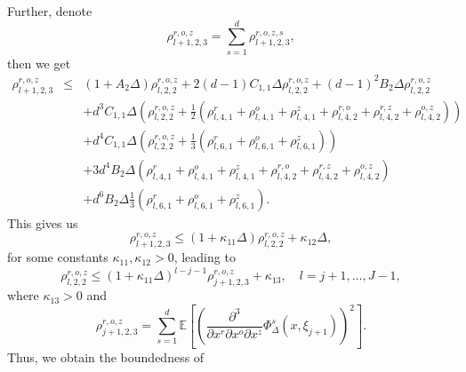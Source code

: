 \documentclass[11pt,a4paper]{amsart}
\theoremstyle{plain}
\theoremstyle{definition}
\theoremstyle{remark}
\numberwithin{equation}{section}
\newcommand*{\EE}{\mathbb E}
\renewcommand*{\doteq}{:=}
\begin{document}
Further, denote 
\[
\rho_{l+1,2,3}^{r,o,z}=\sum_{s=1}^d\rho_{l+1,2,3}^{r,o,z,s},
\]
then we get 
\begin{eqnarray*}
\rho_{l+1,2,3}^{r,o,z} & \leq & (1+A_{2}\Delta)\rho_{l,2,2}^{r,o,z}
+2(d-1)C_{1,1}\Delta\rho_{l,2,2}^{r,o,z}+(d-1)^2B_{2}\Delta\rho_{l,2,2}^{r,o,z}\\
&&+d^3C_{1,1}\Delta\left(\rho_{l,2,2}^{r,o,z}+\frac{1}{2}\left(\rho_{l,4,1}^{r}+\rho_{l,4,1}^{o}+\rho_{l,4,1}^z+\rho_{l,4,2}^{r,o}+\rho_{l,4,2}^{r,z}+\rho_{l,4,2}^{o,z}\right)\right)\\
&&+d^4C_{1,1}\Delta\left(\rho_{l,2,2}^{r,o,z}+\frac{1}{3}\left(\rho_{l,6,1}^{r}+\rho_{l,6,1}^{o}+\rho_{l,6,1}^{z}\right)\right)\\
&&+3d^4B_2\Delta\left(\rho_{l,4,1}^{r}+\rho_{l,4,1}^{o}+\rho_{l,4,1}^z+\rho_{l,4,2}^{r,o}+\rho_{l,4,2}^{r,z}+\rho_{l,4,2}^{o,z}\right)\\
&&+d^6B_2\Delta\frac{1}{3}\left(\rho_{l,6,1}^{r}+\rho_{l,6,1}^{o}+\rho_{l,6,1}^{z}\right).
\end{eqnarray*}
This gives us
\[
\rho_{l+1,2,3}^{r,o,z}\leq (1+\kappa_{11}\Delta)\rho_{l,2,2}^{r,o,z}+\kappa_{12}\Delta,
\]
for some constants $\kappa_{11},\kappa_{12}>0$,
leading to
\[
\rho_{l,2,2}^{r,o,z}\leq(1+\kappa_{11}\Delta)^{l-j-1}\rho_{j+1,2,3}^{r,o,z}+\kappa_{13}
,\quad l=j+1,\ldots,J-1,
\]
where $\kappa_{13}>0$ and
\[
\rho_{j+1,2,3}^{r,o,z}=\sum_{s=1}^d\EE\left[\left(\frac{\partial^3}{\partial x^r\partial x^o\partial x^z}\Phi_{\Delta}^s\left(x,\xi_{j+1}\right)\right)^{2}\right].
\]
Thus, we obtain the boundedness of
\end{document}
